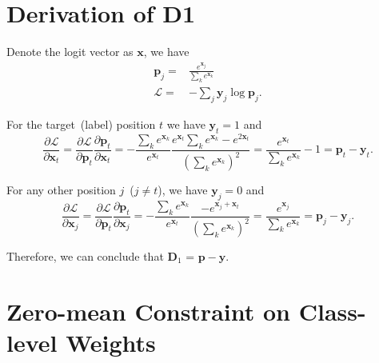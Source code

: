 \appendix

\section{Derivation of D1}
\label{section: Appendx_A}
%
Denote the logit vector as $\boldsymbol x$, we have
\begin{align}
    \boldsymbol p_j =& \frac{e^{\boldsymbol x_j}}{\sum_k e^{\boldsymbol x_k}} \\
    \mathcal{L} =& -\sum_j  \boldsymbol y_j\log{\boldsymbol p_j}.
\end{align}

For the target~(label) position $t$ we have $\boldsymbol y_t=1$  and
\begin{equation}
    \frac{\partial \mathcal{L}}{\partial  \boldsymbol x_t} = \frac{\partial \mathcal{L}}{\partial \boldsymbol p_t}\frac{\partial \boldsymbol p_t}{\partial \boldsymbol x_t} = -\frac{\sum_k e^{\boldsymbol x_k}}{e^{\boldsymbol x_t}}\frac{e^{\boldsymbol x_t}\sum_k e^{\boldsymbol x_k}- e^{2\boldsymbol x_t}}{\left(\sum_k e^{\boldsymbol x_k}\right)^2} = \frac{e^{\boldsymbol x_t}}{\sum_k e^{\boldsymbol x_k}} - 1 = \boldsymbol p_t - \boldsymbol y_t.
\end{equation}

For any other position $j$~($j \neq t$), we have $\boldsymbol y_j = 0$ and 
\begin{equation}
    \frac{\partial \mathcal{L}}{\partial \boldsymbol x_j} = \frac{\partial \mathcal{L}}{\partial \boldsymbol p_t}\frac{\partial \boldsymbol p_t}{\partial \boldsymbol x_j} = -\frac{\sum_k e^{\boldsymbol x_k}}{e^{\boldsymbol x_t}}\frac{-e^{\boldsymbol x_j+\boldsymbol x_t}}{\left(\sum_k e^{\boldsymbol x_k}\right)^2} = \frac{e^{\boldsymbol x_j}}{\sum_k e^{\boldsymbol x_k}} = \boldsymbol p_j - \boldsymbol y_j.
\end{equation}

Therefore, we can conclude that $\boldsymbol D_1$ = $\boldsymbol p - \boldsymbol y$.


\section{Zero-mean Constraint on Class-level Weights}
